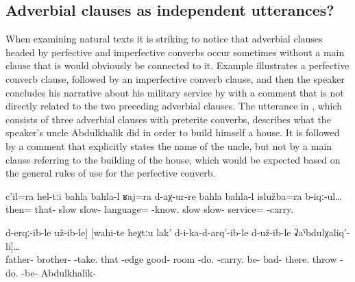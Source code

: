 \subsection{Adverbial clauses as independent utterances?}
\label{ssec:Adverbial clauses as independent utterances}

When examining natural texts it is striking to notice that adverbial clauses headed by perfective and imperfective converbs occur sometimes without a main clause that is would obviously be connected to it. Example  illustrates a perfective converb clause, followed by an imperfective converb clause, and then the speaker concludes his narrative about his military service by with a comment that is not directly related to the two preceding adverbial clauses. The utterance in , which consists of three adverbial clauses with preterite converbs, describes what the speaker's uncle Abdulkhalik did in order to build himself a house. It is followed by a comment that explicitly states the name of the uncle, but not by a main clause referring to the building of the house, which would be expected based on the general rules of use for the perfective converb.
%
\begin{exe}
	\ex	\label{ex:‎‎Then slowly I learned the language and I did my (military) service}
	\gll	c'il=ra	hel-tːi	bahla		bahla-l	ʁaj=ra	d-aχ-ur-re		bahla		bahla-l	islužba=ra b-iqː-ul\ldots\\
		then=		that-	slow		slow-	language=	-know.	slow	slow-	service= -carry.\\
	\glt	{} 

\ex	\label{ex:‎‎The brother of my father (= Abdulkhalik) tore down the wall}
\gll [di-la	atːa-la	ucːi-l	ha-b-ertː-ib-le	il	b-aʔ]		[ʡaˁħ-te	[cin-na	taχna	b-arq'-ij]	d-erqː-ib-le	už-ib-le]		[wahi-te	heχtːu	lak'	d-i-ka-d-arq'-ib-le	d-už-ib-le	ʡaˁbdulχaliq'-li]\ldots \\
	father-	brother-	-take.	that	-edge	good- 		room	-do.	-carry.	be-		bad- 	there.	throw	-do.	-be-	Abdulkhalik- \\
\glt	{}

\end{exe}


